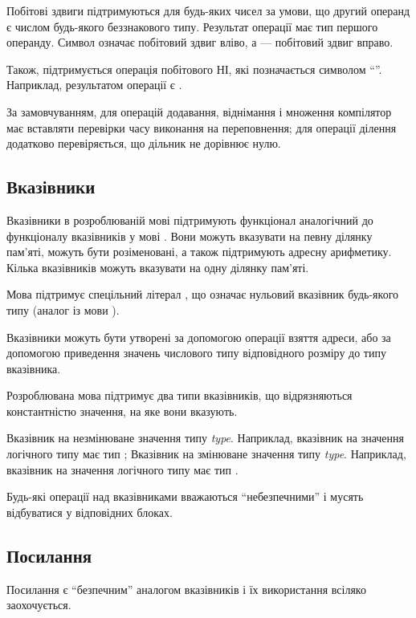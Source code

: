 \documentclass[main.tex]{subfiles}
\begin{document}
Побітові здвиги підтримуються для будь-яких чисел за умови, що другий операнд є числом будь-якого беззнакового типу. Результат операції має тип першого операнду.
Символ \code{\textless\textless} означає побітовий здвиг вліво, а \code{\textgreater\textgreater} --- побітовий здвиг вправо.

Також, підтримується операція побітового НІ, які позначається символом ``\code{!}''. Наприклад, результатом операції  є .

За замовчуванням, для операцій додавання, віднімання і множення компілятор має вставляти перевірки часу виконання на переповнення; для операції ділення додатково перевіряється, що дільник не дорівнює нулю.

\FloatBarrier
\subsection{Вказівники}
Вказівники в розроблюваній мові підтримують функціонал аналогічний до функціоналу вказівників у мові \LangC{}.
Вони можуть вказувати на певну ділянку пам'яті, можуть бути розіменовані, а також підтримують адресну арифметику.
Кілька вказівників можуть вказувати на одну ділянку пам'яті.

Мова підтримує спецільний літерал , що означає нульовий вказівник будь-якого типу (аналог  із мови \LangC{}).

Вказівники можуть бути утворені за допомогою операції взяття адреси, або за допомогою приведення значень числового типу відповідного розміру до типу вказівника.

Розроблювана мова підтримує два типи вказівників, що відрязняються константністю значення, на яке вони вказують.
\begin{itemize}
Вказівник на незмінюване значення типу \emph{type}.
Наприклад, вказівник на значення логічного типу має тип ;
Вказівник на змінюване значення типу \emph{type}.
Наприклад, вказівник на значення логічного типу має тип .
\end{itemize}

Будь-які операції над вказівниками вважаються ``небезпечними'' і мусять відбуватися у відповідних блоках.

\FloatBarrier
\subsection{Посилання}
Посилання є ``безпечним'' аналогом вказівників і їх використання всіляко заохочується.
\end{document}
